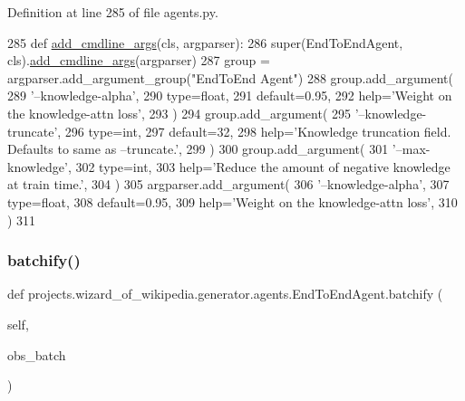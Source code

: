 Definition at line 285 of file agents.\+py.


\begin{DoxyCode}
285     \textcolor{keyword}{def }\hyperlink{namespaceparlai_1_1agents_1_1drqa_1_1config_a62fdd5554f1da6be0cba185271058320}{add\_cmdline\_args}(cls, argparser):
286         super(EndToEndAgent, cls).\hyperlink{namespaceparlai_1_1agents_1_1drqa_1_1config_a62fdd5554f1da6be0cba185271058320}{add\_cmdline\_args}(argparser)
287         group = argparser.add\_argument\_group(\textcolor{stringliteral}{"EndToEnd Agent"})
288         group.add\_argument(
289             \textcolor{stringliteral}{'--knowledge-alpha'},
290             type=float,
291             default=0.95,
292             help=\textcolor{stringliteral}{'Weight on the knowledge-attn loss'},
293         )
294         group.add\_argument(
295             \textcolor{stringliteral}{'--knowledge-truncate'},
296             type=int,
297             default=32,
298             help=\textcolor{stringliteral}{'Knowledge truncation field. Defaults to same as --truncate.'},
299         )
300         group.add\_argument(
301             \textcolor{stringliteral}{'--max-knowledge'},
302             type=int,
303             help=\textcolor{stringliteral}{'Reduce the amount of negative knowledge at train time.'},
304         )
305         argparser.add\_argument(
306             \textcolor{stringliteral}{'--knowledge-alpha'},
307             type=float,
308             default=0.95,
309             help=\textcolor{stringliteral}{'Weight on the knowledge-attn loss'},
310         )
311 
\end{DoxyCode}
\mbox{\label{classprojects_1_1wizard__of__wikipedia_1_1generator_1_1agents_1_1EndToEndAgent_a66886694fb06a243c783d2b7902b46bb}} 
\subsubsection{\texorpdfstring{batchify()}{batchify()}}
{\footnotesize\ttfamily def projects.\+wizard\+\_\+of\+\_\+wikipedia.\+generator.\+agents.\+End\+To\+End\+Agent.\+batchify (\begin{DoxyParamCaption}\item[{}]{self,  }\item[{}]{obs\+\_\+batch }\end{DoxyParamCaption})}

